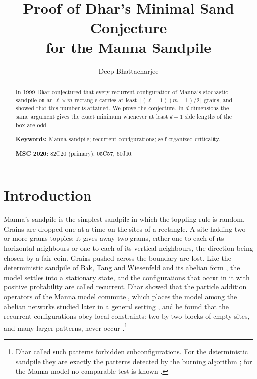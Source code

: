 \documentclass[11pt]{amsart}
\theoremstyle{definition}
\begin{document}
\title[Dhar's minimal sand conjecture]{Proof of Dhar's Minimal Sand Conjecture\\ for the Manna Sandpile}

\author{Deep Bhattacharjee}
\address{Formerly, Electro-Gravitational Space Propulsion Laboratory (EGSPL), Bhubaneswar, Odisha 751030, India}
\address{Formerly, University of Calcutta (Heramba Chandra College), 23/49 Gariahat Road, Golpark, Kolkata 700029, West Bengal, India}

\begin{abstract}
In 1999 Dhar conjectured that every recurrent configuration of Manna's stochastic sandpile on an $\ell\times m$ rectangle carries at least $\lceil(\ell-1)(m-1)/2\rceil$ grains, and showed that this number is attained. We prove the conjecture. In $d$ dimensions the same argument gives the exact minimum whenever at least $d-1$ side lengths of the box are odd.

\medskip\noindent\textbf{Keywords:} Manna sandpile; recurrent configurations; self-organized criticality.

\smallskip\noindent\textbf{MSC 2020:} 82C20 (primary); 05C57, 60J10.
\end{abstract}

\maketitle

\section{Introduction}\label{sec:intro}

Manna's sandpile \cite{Man91} is the simplest sandpile in which the toppling rule is random. Grains are dropped one at a time on the sites of a rectangle. A site holding two or more grains topples: it gives away two grains, either one to each of its horizontal neighbours or one to each of its vertical neighbours, the direction being chosen by a fair coin. Grains pushed across the boundary are lost. Like the deterministic sandpile of Bak, Tang and Wiesenfeld \cite{BTW87,BTW88} and its abelian form \cite{Dha90}, the model settles into a stationary state, and the configurations that occur in it with positive probability are called recurrent. Dhar showed that the particle addition operators of the Manna model commute \cite{Dha99a,Dha99b}, which places the model among the abelian networks studied later in a general setting \cite{BL16}, and he found that the recurrent configurations obey local constraints: two by two blocks of empty sites, and many larger patterns, never occur \cite{Dha99b}.\footnote{Dhar called such patterns forbidden subconfigurations. For the deterministic sandpile they are exactly the patterns detected by the burning algorithm \cite{MD92,Dha90}; for the Manna model no comparable test is known \cite[\S5]{Dha99b}.}
\end{document}
